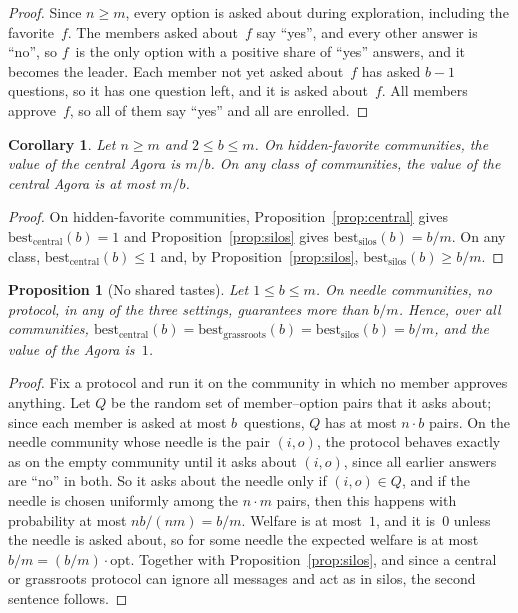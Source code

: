 \documentclass[11pt]{article}
\newtheorem{proposition}{Proposition}
\newtheorem{corollary}{Corollary}
\theoremstyle{definition}
\newcommand{\opt}{\mathrm{opt}}
\newcommand{\best}{\mathrm{best}}
\begin{document}
\begin{proof}
Since $n \ge m$, every option is asked about during exploration, including the favorite~$f$.
The members asked about~$f$ say ``yes'', and every other answer is ``no'', so $f$~is the only option with a positive share of ``yes'' answers, and it becomes the leader.
Each member not yet asked about~$f$ has asked $b-1$ questions, so it has one question left, and it is asked about~$f$.
All members approve~$f$, so all of them say ``yes'' and all are enrolled.
\end{proof}

\begin{corollary}\label{cor:value}
Let $n \ge m$ and $2 \le b \le m$.
On hidden-favorite communities, the value of the central Agora is $m/b$.
On any class of communities, the value of the central Agora is at most $m/b$.
\end{corollary}

\begin{proof}
On hidden-favorite communities, Proposition~\ref{prop:central} gives $\best_{\text{central}}(b) = 1$ and Proposition~\ref{prop:silos} gives $\best_{\text{silos}}(b) = b/m$.
On any class, $\best_{\text{central}}(b) \le 1$ and, by Proposition~\ref{prop:silos}, $\best_{\text{silos}}(b) \ge b/m$.
\end{proof}

\begin{proposition}[No shared tastes]\label{prop:needle}
Let $1 \le b \le m$.
On needle communities, no protocol, in any of the three settings, guarantees more than $b/m$.
Hence, over all communities, $\best_{\text{central}}(b) = \best_{\text{grassroots}}(b) = \best_{\text{silos}}(b) = b/m$, and the value of the Agora is~$1$.
\end{proposition}

\begin{proof}
Fix a protocol and run it on the community in which no member approves anything.
Let $Q$ be the random set of member--option pairs that it asks about; since each member is asked at most $b$~questions, $Q$ has at most $n \cdot b$ pairs.
On the needle community whose needle is the pair $(i, o)$, the protocol behaves exactly as on the empty community until it asks about $(i, o)$, since all earlier answers are ``no'' in both.
So it asks about the needle only if $(i, o) \in Q$, and if the needle is chosen uniformly among the $n \cdot m$ pairs, then this happens with probability at most $n b / (n m) = b/m$.
Welfare is at most~$1$, and it is~$0$ unless the needle is asked about, so for some needle the expected welfare is at most $b/m = (b/m)\cdot\opt$.
Together with Proposition~\ref{prop:silos}, and since a central or grassroots protocol can ignore all messages and act as in silos, the second sentence follows.
\end{proof}
\end{document}
